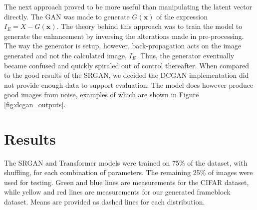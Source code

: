 \documentclass[letterpaper]{article} %
\begin{document}
The next approach proved to be more useful than manipulating the latent vector directly.
The GAN was made to generate $G(\mathbf{x})$ of
the expression $I_E = X - G(\mathbf{x})$. The theory behind this approach was to train
the model to generate the enhancement by inversing the alterations made in pre-processing.
The way the generator is setup, however, back-propagation acts on the image generated
and not the calculated image, $I_E$.
Thus, the generator eventually became confused and quickly spiraled out of control thereafter.
When compared to the good results of the SRGAN,
we decided the DCGAN implementation did not provide enough data to support evaluation.
The model does however produce good images from noise,
examples of which are shown in Figure \ref{fig:dcgan_outputs}.


\section{Results}
The SRGAN and Transformer models were trained on 75\% of the dataset, with shuffling,
for each combination of parameters.
The remaining 25\% of images were used for testing.
Green and blue lines are measurements for the CIFAR dataset, while
yellow and red lines are measurements for our generated frameblock dataset.
Means are provided as dashed lines for each distribution.
\end{document}
